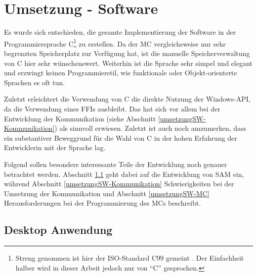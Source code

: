 
\chapter{Umsetzung - Software} \label{umsetzungSW}

\nocite{*}


Es wurde sich entschieden, die gesamte Implementierung der Software in der Programmiersprache C\footnote{Streng genommen ist hier der ISO-Standard C99 gemeint \cite*[siehe ][]{iso.c99}. Der Einfachheit halber wird in dieser Arbeit jedoch nur von \enquote{C} gesprochen.} zu erstellen.
Da der \ac{MC} vergleichsweise nur sehr begrenzten Speicherplatz zur Verfügung hat, ist die manuelle Speicherverwaltung von C hier sehr wünschenswert.
Weiterhin ist die Sprache sehr simpel und elegant und erzwingt keinen Programmierstil, wie funktionale oder Objekt-orienterte Sprachen es oft tun.

Zuletzt erleichtert die Verwendung von C die direkte Nutzung der Windows-API, da die Verwendung eines \ac{FFI}s ausbleibt.
Das hat sich vor allem bei der Entwicklung der Kommunikation (siehe Abschnitt \ref{umsetzungSW-Kommunikation}) als sinnvoll erwiesen.
Zuletzt ist auch noch amzumerken, dass ein substantiver Beweggrund für die Wahl von C in der hohen Erfahrung der Entwicklerin mit der Sprache lag. %

Folgend sollen besonders interessante Teile der Entwicklung noch genauer betrachtet werden.
Abschnitt \ref{umsetzungSW-UI} geht dabei auf die Entwicklung von \ac{SAM} ein, während Abschnitt \ref{umsetzungSW-Kommunikation} Schwierigkeiten bei der Umsetzung der Kommunikation und Abschnitt \ref{umsetzungSW-MC} Herausforderungen bei der Programmierung des \ac{MC}s beschreibt.


\section{Desktop Anwendung} \label{umsetzungSW-UI}


